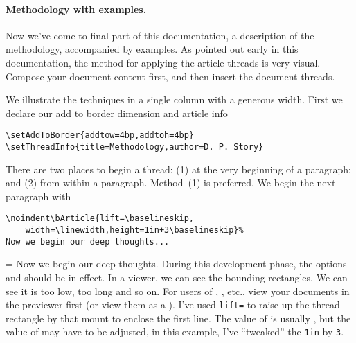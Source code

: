 \documentclass{article}
\begin{document}
\paragraph*{Methodology with examples.} Now we've come to final part of this
documentation, a description of the methodology, accompanied by examples. As
pointed out early in this documentation, the method for applying the article
threads is very visual. Compose your document content first, and then insert the
document threads.
\begin{center}\previewOn\viewMagWinOn
\begin{minipage}{.8\linewidth}\parindent=20pt\relax
We illustrate the techniques in a single column with a generous width.
First we declare our add to border dimension and article info
\begin{Verbatim}[xleftmargin=\amtIndent,fontsize=\small]
\setAddToBorder{addtow=4bp,addtoh=4bp}
\setThreadInfo{title=Methodology,author=D. P. Story}
\end{Verbatim}
There are two places to begin a thread: (1) at the very beginning of a paragraph;
and (2) from within a paragraph. Method~(1) is preferred. We begin the next paragraph
with
\begin{Verbatim}[xleftmargin=\amtIndent,fontsize=\small]
\noindent\bArticle{lift=\baselineskip,
    width=\linewidth,height=1in+3\baselineskip}%
Now we begin our deep thoughts...
\end{Verbatim}
\end{minipage}
\end{center}

\def\pi{\noindent\makebox[0pt][r]{\ding{182}\hskip\marginparsep}}
\def\pii{\noindent\makebox[0pt][r]{\ding{183}\hskip\marginparsep}}
\def\piii{\noindent\makebox[0pt][r]{\ding{184}\hskip\marginparsep}}

\begin{center}\previewOn\viewMagWinOn
\begin{minipage}{.8\linewidth}\parindent=\amtIndent\relax
\newtopic\noindent{}%
\pi\indent
Now we begin our deep thoughts. During this development phase, the options
 and  should be in effect. In a 
viewer, we can see the bounding rectangles. We can see it is too low, too long
and so on. For users of , , etc., view your
documents in the  previewer first (or view them as a ).
I've used \texttt{lift=\string\baselineskip} to raise up the thread rectangle
by that mount to enclose the first line. The value of  is usually
, but the value of  may have to be adjusted, in this
example, I've ``tweaked'' the \texttt{1in} by \texttt{3\string\baselineskip}.
\end{minipage}
\end{center}
\end{document}
